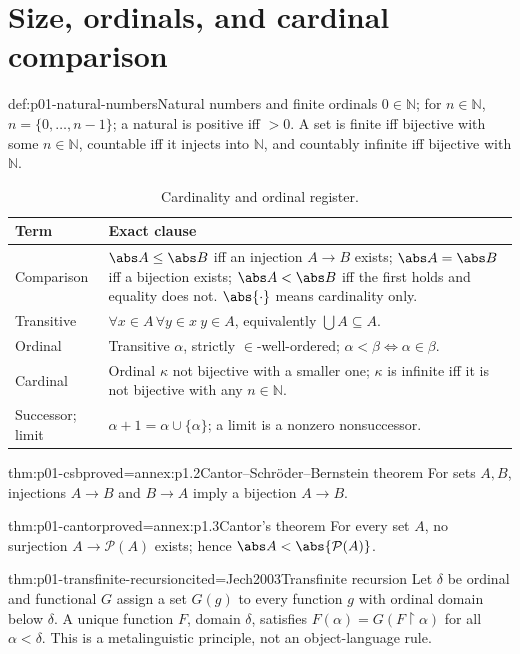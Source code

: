 \section{Size, ordinals, and cardinal comparison}
\label{sec:p01-size-ordinals}
\begin{hbconvention}{def:p01-natural-numbers}{Natural numbers and finite ordinals}
\(0\in\mathbb N\); for \(n\in\mathbb N\),
\(n=\{0,\ldots,n-1\}\); a natural is positive iff \(>0\).
A set is finite iff bijective with some \(n\in\mathbb N\), countable iff it
injects into \(\mathbb N\), and countably infinite iff bijective with
\(\mathbb N\).
\end{hbconvention}
\begingroup\small
\begin{longtable}{@{}p{}p{}@{}}
\caption{Cardinality and ordinal register.}\label{tab:p01-cardinal-ordinal-register}\\
\toprule Term & Exact clause \\ \midrule
Comparison\index{cardinality!comparison} & \(\abs A\leq\abs B\) iff an
injection \(A\to B\) exists; \(\abs A=\abs B\) iff a bijection exists;
\(\abs A<\abs B\) iff the first holds and equality does not.
\(\abs{\cdot}\) means cardinality only. \\
Transitive\index{transitive set} &
\(\forall x\in A\,\forall y\in x\ y\in A\), equivalently
\(\bigcup A\subseteq A\). \\
Ordinal\index{ordinal} & Transitive \(\alpha\), strictly \(\in\)-well-ordered;
\(\alpha<\beta\iff\alpha\in\beta\). \\
Cardinal\index{cardinal}\index{infinite cardinal} & Ordinal \(\kappa\) not
bijective with a smaller one; \(\kappa\) is infinite iff it is not bijective
with any \(n\in\mathbb N\). \\
Successor; limit\index{successor ordinal}\index{limit ordinal} &
\(\alpha+1=\alpha\cup\{\alpha\}\); a limit is a nonzero nonsuccessor. \\
\bottomrule
\end{longtable}
\endgroup

\begin{hbtheorem}{thm:p01-csb}{proved=annex:p1.2}{Cantor--Schr\"oder--Bernstein theorem}
For sets \(A,B\), injections \(A\to B\) and \(B\to A\) imply a bijection
\(A\to B\).
\end{hbtheorem}
\begin{hbtheorem}{thm:p01-cantor}{proved=annex:p1.3}{Cantor's theorem}
For every set \(A\), no surjection \(A\to\mathcal P(A)\) exists; hence
\(\abs A<\abs{\mathcal P(A)}\).
\end{hbtheorem}
\begin{hbtheorem}{thm:p01-transfinite-recursion}{cited=Jech2003}{Transfinite recursion}
Let \(\delta\) be ordinal and functional \(G\) assign a set \(G(g)\) to every
function \(g\) with ordinal domain below \(\delta\).  A unique function
\(F\), domain \(\delta\), satisfies
\(F(\alpha)=G(F\mathbin{\upharpoonright}\alpha)\) for all \(\alpha<\delta\).
This is a metalinguistic principle, not an object-language rule.
\end{hbtheorem}

